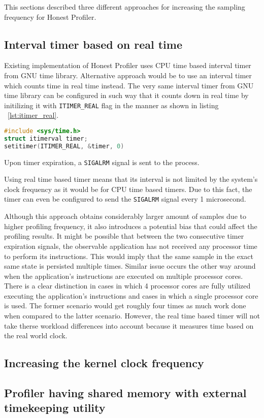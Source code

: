 \documentclass[..thesis.tex]{subfiles}
\begin{document}
This sections described three different approaches for increasing the sampling frequency for Honest Profiler.

\subsection{Interval timer based on real time}
Existing implementation of Honest Profiler uses CPU time based interval timer from GNU time library. Alternative approach would be to use an interval timer which counts time in real time instead. The very same interval timer from GNU time library can be configured in such way that it counts down in real time by initilizing it with \texttt{ITIMER\_REAL} flag in the manner as shown in listing ~\ref{lst:itimer_real}.

\begin{lstlisting}[language=C++,style=def,label={lst:itimer_real}, caption={Timer initialization based on real time}]
#include <sys/time.h>
struct itimerval timer;
setitimer(ITIMER_REAL, &timer, 0)
\end{lstlisting}

Upon timer expiration, a \texttt{SIGALRM} signal is sent to the process.\cite{getitimer2}

Using real time based timer means that its interval is not limited by the system's clock frequency as it would be for CPU time based timers. Due to this fact, the timer can even be configured to send the \texttt{SIGALRM} signal every 1 microsecond.

Although this approach obtains considerably larger amount of samples due to higher profiling frequency, it also introduces a potential bias that could affect the profiling results. It might be possible that between the two consecutive timer expiration signals, the observable application has not received any processor time to perform its instructions. This would imply that the same sample in the exact same state is persisted multiple times. Similar issue occurs the other way around when the application's instructions are executed on multiple processor cores. There is a clear distinction in cases in which 4 processor cores are fully utilized executing the application's instructions and cases in which a single processor core is used. The former scenario would get roughly four times as much work done when compared to the latter scenario. However, the real time based timer will not take therse workload differences into account because it measures time based on the real world clock.


\subsection{Increasing the kernel clock frequency}

\subsection{Profiler having shared memory with external timekeeping utility}
\end{document}
